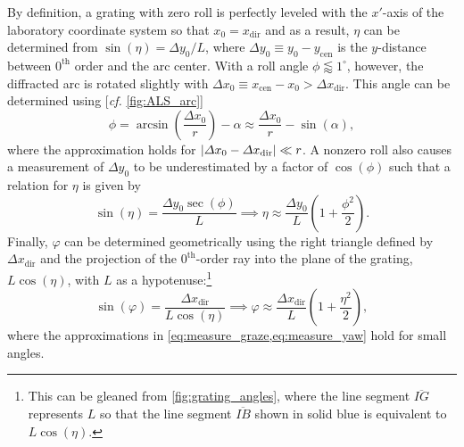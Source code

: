 By definition, a grating with zero roll is perfectly leveled with the $x'$-axis of the laboratory coordinate system so that $x_0 = x_{\text{dir}}$ and as a result, $\eta$ can be determined from $\sin \left( \eta \right) = \Delta y_0 / L$, where $\Delta y_0 \equiv y_0 - y_{\text{cen}}$ is the $y$-distance between $0^{\text{th}}$ order and the arc center. 
With a roll angle $\phi \lessapprox 1^{\circ}$, however, the diffracted arc is rotated slightly with $\Delta x_0 \equiv x_{\text{cen}} - x_0 > \Delta x_{\text{dir}}$. 
This angle can be determined using [\emph{cf.\@} \cref{fig:ALS_arc}] %
\begin{equation}\label{eq:measure_roll}
 \phi = \arcsin \left( \frac{\Delta x_0}{r} \right) - \alpha \approx \frac{\Delta x_0}{r} - \sin \left( \alpha \right) ,
 \end{equation}
where the approximation holds for $\abs{\Delta x_0 - \Delta x_{\text{dir}}} \ll r$. 
A nonzero roll also causes a measurement of $\Delta y_0$ to be underestimated by a factor of $\cos \left( \phi \right)$ such that 
a relation for $\eta$ is given by 
\begin{equation}\label{eq:measure_graze}
 \sin \left( \eta \right) = \frac{\Delta y_0 \sec \left( \phi \right)}{L} \implies \eta \approx \frac{\Delta y_0}{L} \left(1 + \frac{\phi^2}{2} \right)  .
 \end{equation}
Finally, $\varphi$ can be determined geometrically using the right triangle defined by $\Delta x_{\text{dir}}$ and the projection of the $0^{\text{th}}$-order ray into the plane of the grating, $L \cos \left( \eta \right)$, with $L$ as a hypotenuse:\footnote{This can be gleaned from \cref{fig:grating_angles}, where the line segment $\overline{IG}$ represents $L$ so that the line segment $\overline{IB}$ shown in solid blue is equivalent to $L \cos \left( \eta \right)$.}
\begin{equation}\label{eq:measure_yaw}
 \sin \left( \varphi \right) = \frac{\Delta x_{\text{dir}}}{L \cos \left( \eta \right)} \implies \varphi \approx \frac{\Delta x_{\text{dir}}}{L} \left(1 + \frac{\eta^2}{2} \right) ,
 \end{equation}
where the approximations in \cref{eq:measure_graze,eq:measure_yaw} hold for small angles. 

